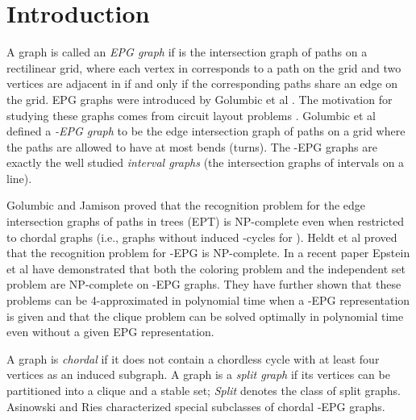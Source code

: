 \documentclass[11pt,3p,times]{elsarticle}
\begin{document}
\section{Introduction}
A graph  is called an {\em EPG graph} if  is  the
intersection graph of paths on a rectilinear grid, where each vertex in 
corresponds to a path on the grid and two vertices are adjacent in
 if and only if the corresponding paths share an edge on the grid. EPG
graphs were introduced by Golumbic et al \cite{Gol2009}. The
motivation for studying these graphs comes from circuit layout
problems \cite{Ban1990}. Golumbic et al \cite{Gol2009} defined a {\em
-EPG graph} to be the edge intersection graph of paths on a
grid where the paths are allowed to have at most  bends
(turns). The -EPG graphs are exactly the well studied {\em
interval graphs} (the intersection graphs of intervals on a line).

Golumbic and Jamison \cite{Gol1985}
proved that  the recognition problem for the edge intersection
graphs of paths in trees (EPT) is NP-complete even when restricted
to chordal graphs (i.e., graphs without induced -cycles for ). Heldt et al \cite{Hel2010} proved that the recognition problem for
-EPG is NP-complete.
In a recent paper Epstein et al \cite{EpsteinGM13} have demonstrated that both the
coloring problem and the independent set problem are NP-complete on -EPG graphs.
They have further shown that these problems can be 4-approximated in polynomial time
when a -EPG representation is given and that the clique problem can be solved
optimally in polynomial time even without a given EPG representation.

A graph is {\em chordal} if it does not
contain a chordless cycle with at least four vertices as an
induced subgraph. A graph is a {\em split graph} if its vertices
can be partitioned into a clique and a stable set; {\em Split}
denotes the class of split graphs. Asinowski and
Ries \cite{Asi2012} characterized special subclasses of chordal
-EPG graphs.
\end{document}

